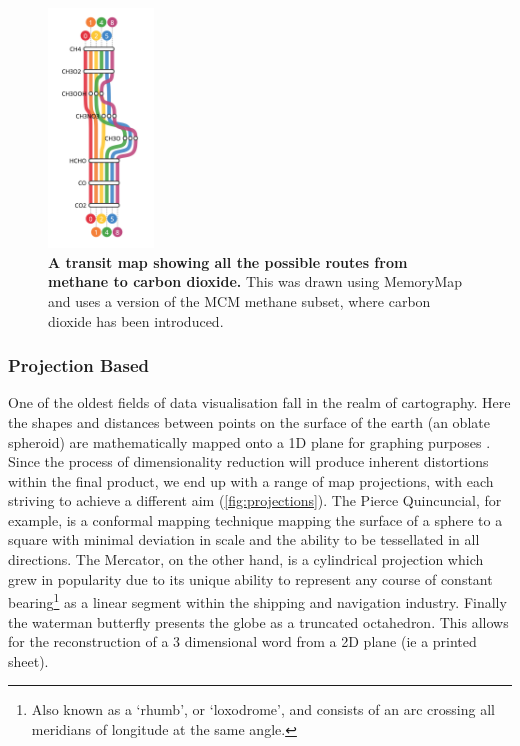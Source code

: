 \begin{figure}[H]
     \centering
     \includegraphics[width=0.25\textwidth, angle=0]{figures_c1/layout/memory.png}
         \caption{\textbf{A transit map showing all the possible routes from methane to carbon dioxide.} This was drawn using MemoryMap \citep{memory} and uses a version of the MCM methane subset, where carbon dioxide has been introduced.}
        \label{fig:mem}
\end{figure}





\subsubsection{Projection Based}\label{sec:merc}
One of the oldest fields of data visualisation fall in the realm of cartography. Here the shapes and distances between points on the surface of the earth (an oblate spheroid) are mathematically mapped onto a 1D plane for graphing purposes \citep{projections}. Since the process of dimensionality reduction will produce inherent distortions within the final product, we end up with a range of map projections, with each striving to achieve a different aim (\autoref{fig:projections}). The Pierce Quincuncial, for example, is a conformal mapping technique mapping the surface of a sphere to a square with minimal deviation in scale and the ability to be tessellated in all directions. The Mercator, on the other hand, is a cylindrical projection which grew in popularity due to its unique ability to represent any course of constant bearing\footnote{Also known as a `rhumb', or `loxodrome', and consists of an arc crossing all meridians of longitude at the same angle.} as a linear segment within the shipping and navigation industry.  Finally the waterman butterfly presents the globe as a truncated octahedron. This allows for the reconstruction of a 3 dimensional word from a 2D plane (ie a printed sheet). 

